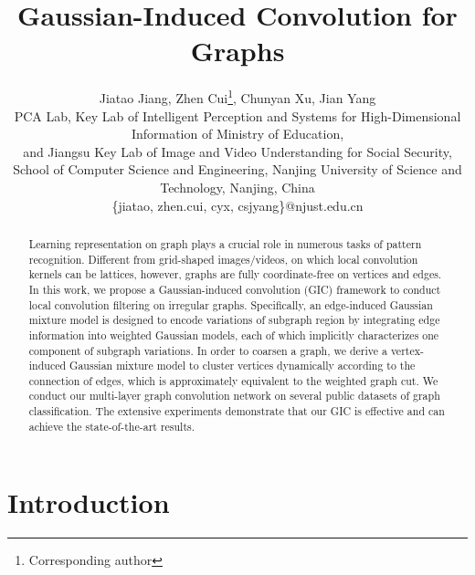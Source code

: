 \documentclass[letterpaper]{article} \usepackage{aaai19}  \usepackage{times}  \usepackage{helvet}  \usepackage{courier}  \usepackage{url}  \usepackage{graphicx}  \frenchspacing  \setlength{\pdfpagewidth}{8.5in}  \setlength{\pdfpageheight}{11in}
\begin{document}
\title{Gaussian-Induced Convolution for Graphs}
\author{Jiatao Jiang, Zhen Cui\thanks{Corresponding author}, Chunyan Xu, Jian Yang\\
	PCA Lab, Key Lab of Intelligent Perception and Systems for High-Dimensional Information of Ministry of Education,\\
	and Jiangsu Key Lab of Image and Video Understanding for Social Security,\\
	School of Computer Science and Engineering, Nanjing University of Science and Technology, Nanjing, China\\
	\{jiatao, zhen.cui, cyx, csjyang\}@njust.edu.cn\\
} 

\maketitle

\begin{abstract}
Learning representation on graph plays a crucial role in numerous tasks of pattern recognition. Different from grid-shaped images/videos, on which local convolution kernels can be  lattices, however, graphs are fully coordinate-free on vertices and edges. In this work, we propose a Gaussian-induced convolution (GIC) framework to conduct local convolution filtering on irregular graphs. Specifically, an edge-induced Gaussian mixture model is designed to encode variations of subgraph region by integrating edge information into weighted Gaussian models, each of which implicitly characterizes one component of subgraph variations. In order to coarsen a graph, we derive a vertex-induced Gaussian mixture model to cluster vertices dynamically according to the connection of edges, which is approximately equivalent to the weighted graph cut. We conduct our multi-layer graph convolution network on several public datasets of graph classification. The extensive experiments demonstrate that our GIC is effective and can achieve the state-of-the-art results.
\end{abstract}


\section{Introduction}
\end{document}
